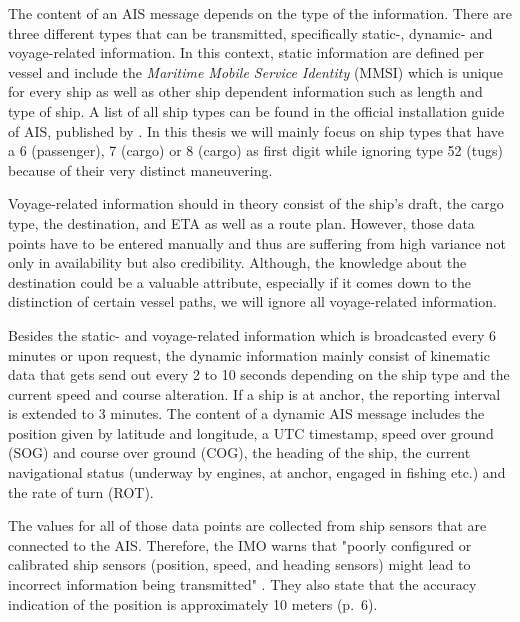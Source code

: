 The content of an AIS message depends on the type of the information. There are three different types that can be transmitted, specifically static-, dynamic- and voyage-related information. In this context, static information are defined per vessel and include the \textit{Maritime Mobile Service Identity} (MMSI) which is unique for every ship as well as other ship dependent information such as length and type of ship. A list of all ship types can be found in the official installation guide of AIS, published by \cite{imo2}. In this thesis we will mainly focus on ship types that have a 6 (passenger), 7 (cargo) or 8 (cargo) as first digit while ignoring type 52 (tugs) because of their very distinct maneuvering.
\par
Voyage-related information should in theory consist of the ship's draft, the cargo type, the destination, and ETA as well as a route plan. However, those data points have to be entered manually and thus are suffering from high variance not only in availability but also credibility. Although, the knowledge about the destination could be a valuable attribute, especially if it comes down to the distinction of certain vessel paths, we will ignore all voyage-related information.
\par
Besides the static- and voyage-related information which is broadcasted every 6 minutes or upon request, the dynamic information mainly consist of kinematic data that gets send out every 2 to 10 seconds depending on the ship type and the current speed and course alteration. If a ship is at anchor, the reporting interval is extended to 3 minutes. The content of a dynamic AIS message includes the position given by latitude and longitude, a UTC timestamp, speed over ground (SOG) and course over ground (COG), the heading of the ship, the current navigational status (underway by engines, at anchor, engaged in fishing etc.) and the rate of turn (ROT). 
\par
The values for all of those data points are collected from ship sensors that are connected to the AIS. Therefore, the IMO warns that "poorly configured or calibrated ship sensors (position,
speed, and heading sensors) might lead to incorrect information being transmitted" \cite[p.~11]{international2015revised}. They also state that the accuracy indication of the position is approximately 10 meters (p.~6).